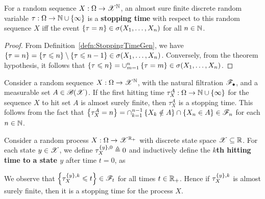 \documentclass[a4paper,10pt,english]{article}
\begin{document}
\begin{prop} 
For a random sequence $X: \Omega \to \mathscr{X}^{\mathbb{N}}$, 
an almost sure finite discrete random variable $\tau: \Omega \to \mathbb{N}\cup\left\{\infty\right\}$ is a \textbf{stopping time} with respect to this random sequence $X$ iff the event $\left\{\tau = n\right\} \in \sigma(X_1, \dots, X_n)$ for all $n \in \mathbb{N}$. 
\end{prop}
\begin{proof}
From Definition~\ref{defn:StoppingTimeGen}, 
we have $\left\{\tau = n\right\} = \left\{\tau \leqslant n\right\}\setminus\left\{\tau \leqslant n-1\right\} \in \sigma(X_1, \dots, X_n)$. 
Conversely, from the theorem hypothesis, it follows that $\left\{\tau \leqslant n\right\} = \cup_{m=1}^n\left\{\tau = m\right\} \in \sigma(X_1, \dots, X_n)$. 
\end{proof}
\begin{shaded}
\begin{exmp} 
Consider a random sequence $X: \Omega \to \mathscr{X}^{\mathbb{N}}$, 
with the natural filtration $\mathscr{F}_\bullet$,   
and a measurable set $A \in \mathscr{B}(\mathscr{X})$. 
If the first hitting time $\tau_X^A:\Omega\to\mathbb{N}\cup\left\{\infty\right\}$ for the sequence $X$ to hit set $A$ is 
almost surely finite, then $\tau_X^A$ is a stopping time. 
This follows from the fact that $\left\{\tau_X^A = n\right\} = \cap_{k=1}^{n-1}\left\{X_k \notin A\right\}\cap\left\{X_n \in A\right\} \in \mathscr{F}_n$ for each $n \in \mathbb{N}$. 
\end{exmp}
\end{shaded}
\begin{defn} 
Consider a random process $X:\Omega\to \mathscr{X}^{\mathbb{R}_+}$ with discrete state space $\mathscr{X}\subseteq\mathbb{R}$. 
For each state $y \in \mathscr{X}$, we define $\tau_X^{\left\{y\right\},0} \triangleq 0$ and inductively define the \textbf{$k$th hitting time to a state $y$} after time $t = 0$, as 
\end{defn}
\begin{rem} 
We observe that $\left\{\tau_X^{\left\{y\right\}, k} \leqslant t\right\} \in \mathscr{F}_t$ for all times $t \in \mathbb{R}_+$. 
Hence if $\tau_X^{\left\{y\right\}, k}$ is almost surely finite, then it is a stopping time for the process $X$. 
\end{rem}
\end{document}
